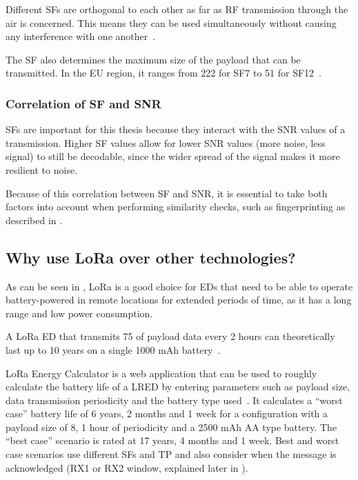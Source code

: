 Different \aclp{SF} are orthogonal to each other as far as \ac{RF} transmission through the air is concerned.
This means they can be used simultaneously without causing any interference with one another~\cite{the_things_network_spreading_2023}.

The \ac{SF} also determines the maximum size of the payload that can be transmitted.
In the \ac{EU} region, it ranges from \SI{222}{\byte} for \ac{SF}7 to \SI{51}{\byte} for \ac{SF}12~\cite[p. 10f]{lora_alliance_inc_lorawan_regional_2017}.

\subsubsection{Correlation of \acs{SF} and \acs{SNR}}\label{sec:sf-snr-correlation}

\aclp{SF} are important for this thesis because they interact with the \ac{SNR} values of a transmission.
Higher \ac{SF} values allow for lower \ac{SNR} values (more noise, less signal) to still be decodable, since the wider spread of the signal makes it more resilient to noise.

Because of this correlation between \acl{SF} and \acl{SNR}, it is essential to take both factors into account when performing similarity checks, such as fingerprinting as described in .

\subsection{Why use \acs{LoRa} over other technologies?}

As can be seen in , \ac{LoRa} is a good choice for \aclp{ED} that need to be able to operate battery-powered in remote locations for extended periods of time, as it has a long range and low power consumption.

A \ac{LoRa} \acl{ED} that transmits \SI{75}{\byte} of payload data every 2 hours can theoretically last up to 10 years on a single 1000 mAh battery~\cite{cheong_comparison_2017}.

LoRa Energy Calculator is a web application that can be used to roughly calculate the battery life of a \acl{LRED} by entering parameters such as payload size, data transmission periodicity and the battery type used~\cite{dramco_research_group_lora_2023}.
It calculates a ``worst case'' battery life of 6 years, 2 months and 1 week for a configuration with a payload size of \SI{8}{\byte}, 1 hour of periodicity and a 2500 mAh AA type battery.
The ``best case'' scenario is rated at 17 years, 4 months and 1 week.
Best and worst case scenarios use different \aclp{SF} and \ac{TP} and also consider when the message is acknowledged (RX1 or RX2 window, explained later in ).

